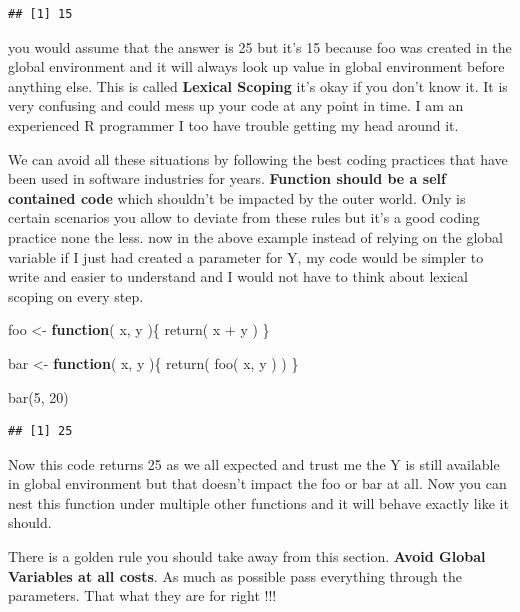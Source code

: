 \documentclass[
]{book}
\newenvironment{Shaded}{\begin{snugshade}}{\end{snugshade}}
\newcommand{\ControlFlowTok}[1]{\textcolor[rgb]{0.13,0.29,0.53}{\textbf{#1}}}
\newcommand{\DecValTok}[1]{\textcolor[rgb]{0.00,0.00,0.81}{#1}}
\newcommand{\FunctionTok}[1]{\textcolor[rgb]{0.00,0.00,0.00}{#1}}
\newcommand{\NormalTok}[1]{#1}
\newcommand{\OtherTok}[1]{\textcolor[rgb]{0.56,0.35,0.01}{#1}}
\newcommand{\SpecialCharTok}[1]{\textcolor[rgb]{0.00,0.00,0.00}{#1}}
\begin{document}
\begin{verbatim}
## [1] 15
\end{verbatim}

you would assume that the answer is 25 but it's 15 because foo was created in the global environment and it will always look up value in global environment before anything else. This is called \textbf{Lexical Scoping} it's okay if you don't know it. It is very confusing and could mess up your code at any point in time. I am an experienced R programmer I too have trouble getting my head around it.

We can avoid all these situations by following the best coding practices that have been used in software industries for years. \textbf{Function should be a self contained code} which shouldn't be impacted by the outer world. Only is certain scenarios you allow to deviate from these rules but it's a good coding practice none the less. now in the above example instead of relying on the global variable if I just had created a parameter for Y, my code would be simpler to write and easier to understand and I would not have to think about lexical scoping on every step.

\begin{Shaded}
\begin{Highlighting}[]
\NormalTok{foo }\OtherTok{\textless{}{-}} \ControlFlowTok{function}\NormalTok{( x, y )\{}
   \FunctionTok{return}\NormalTok{( x }\SpecialCharTok{+}\NormalTok{ y )}
\NormalTok{\}}


\NormalTok{bar }\OtherTok{\textless{}{-}} \ControlFlowTok{function}\NormalTok{( x, y )\{}
  \FunctionTok{return}\NormalTok{(}
    \FunctionTok{foo}\NormalTok{( x, y )    }
\NormalTok{  )}
\NormalTok{\}}

\FunctionTok{bar}\NormalTok{(}\DecValTok{5}\NormalTok{, }\DecValTok{20}\NormalTok{)}
\end{Highlighting}
\end{Shaded}

\begin{verbatim}
## [1] 25
\end{verbatim}

Now this code returns 25 as we all expected and trust me the Y is still available in global environment but that doesn't impact the foo or bar at all. Now you can nest this function under multiple other functions and it will behave exactly like it should.

There is a golden rule you should take away from this section. \textbf{Avoid Global Variables at all costs}. As much as possible pass everything through the parameters. That what they are for right !!!
\end{document}
